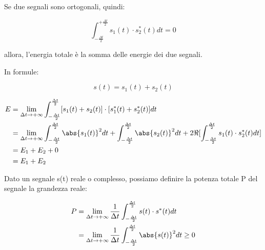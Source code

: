 Se due segnali sono ortogonali, quindi: 

{
    \Large 
    \begin{equation}
        \int_{- \frac{\Delta t}{2}}^{+ \frac{\Delta t}{2}} s_1(t) \cdot s_2 ^{*} (t) dt = 0
    \end{equation}
}

allora, l'energia totale è la somma delle energie dei due segnali. \newline 

In formule: 

{
    \Large 
    \begin{equation}
        s(t) = s_1 (t) + s_2 (t)
    \end{equation}
}

{
    \Large 
    \begin{equation}
        \begin{split}
            E 
            &= 
            \lim_{\Delta t \rightarrow + \infty} 
            \int_{- \frac{\Delta t}{2}}^{\frac{\Delta t}{2}}
            [s_1 (t) + s_2 (t)] \cdot [s_1 ^{*} (t) + s_2 ^{*} (t)] dt 
            \\ 
            &= 
            \lim_{\Delta t \rightarrow + \infty} 
            \int_{- \frac{\Delta t}{2}}^{\frac{\Delta t}{2}}
            \abs{s_1 (t)} ^{2} dt 
            + 
            \int_{- \frac{\Delta t}{2}}^{\frac{\Delta t}{2}}
            \abs{s_2 (t)} ^{2} dt 
            + 
            2 \Re [\int_{- \frac{\Delta t}{2}}^{\frac{\Delta t}{2}}
            s_1 (t) \cdot s_2 ^{*} (t) dt] 
            \\
            &= E_1 + E_2 + 0 
            \\ 
            &= E_1 + E_2
        \end{split}
    \end{equation}
}

Dato un segnale s(t) reale o complesso, 
possiamo definire la potenza totale P del segnale la grandezza reale: 

{
    \Large 
    \begin{equation}
        \begin{split}
        P 
        &= 
        \lim_{\Delta t \rightarrow + \infty} 
        \frac{1}{\Delta t}
        \int_{- \frac{\Delta t}{2}}^{\frac{\Delta t}{2}} 
        s(t) \cdot s^{*} (t) dt 
        \\ 
        &= 
        \lim_{\Delta t \rightarrow + \infty} 
        \frac{1}{\Delta t}
        \int_{- \frac{\Delta t}{2}}^{\frac{\Delta t}{2}} 
        \abs{s(t)} ^{2} dt 
        \geq 0
        \end{split}
    \end{equation}
}

